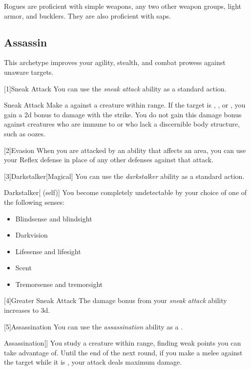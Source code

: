         Rogues are proficient with simple weapons, any two other weapon groups, light armor, and bucklers.
        They are also proficient with saps.

    \subsection{Assassin}
        This archetype improves your agility, stealth, and combat prowess against unaware targets.

        [1]{Sneak Attack} You can use the \textit{sneak attack} ability as a standard action.
        \begin{freeability}{Sneak Attack}
            Make a  against a creature within \rngclose range.
            If the target is \unaware, , or , you gain a \plus2d bonus to damage with the strike.
            You do not gain this damage bonus against creatures who are immune to  or who lack a discernible body structure, such as oozes.
        \end{freeability}

        [2]{Evasion} When you are attacked by an ability that affects an area, you can use your Reflex defense in place of any other defenses against that attack.

        [3]{Darkstalker}[Magical] You can use the \textit{darkstalker} ability as a standard action.
        \begin{attuneability}{Darkstalker}[ (self)]
            You become completely undetectable by your choice of one of the following senses:
            \begin{itemize}
                \item Blindsense and blindsight
                \item Darkvision
                \item Lifesense and lifesight
                \item Scent
                \item Tremorsense and tremorsight
            \end{itemize}
        \end{attuneability}

        [4]{Greater Sneak Attack} The damage bonus from your \textit{sneak attack} ability increases to \plus3d.

        [5]{Assassination} You can use the \textit{assassination} ability as a .
        \begin{freeability}{Assassination}[]
            You study a creature within \rngmed range, finding weak points you can take advantage of.
            Until the end of the next round, if you make a melee  against the target while it is \unaware, your attack deals maximum damage.
        \end{freeability}

